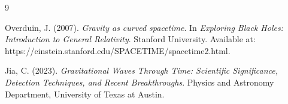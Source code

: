 \documentclass[12pt]{article}
\begin{document}
\begin{thebibliography}{9}

Overduin, J. (2007). \textit{Gravity as curved spacetime}. In \textit{Exploring Black Holes: Introduction to General Relativity}. Stanford University. Available at: https://einstein.stanford.edu/SPACETIME/spacetime2.html.

Jia, C. (2023). \textit{Gravitational Waves Through Time: Scientific Significance, Detection Techniques, and Recent Breakthroughs}. Physics and Astronomy Department, University of Texas at Austin.

\end{thebibliography}
\end{document}
